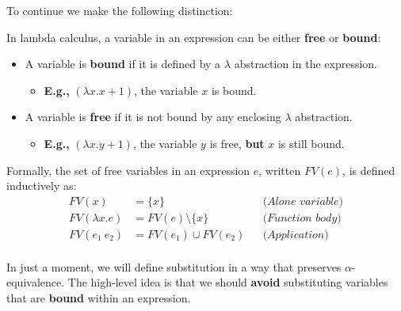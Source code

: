 \noindent
To continue we make the following distinction:
\begin{Def}

    In lambda calculus, a variable in an expression can be either \textbf{free} or \textbf{bound}:
    
    \begin{itemize}
      \item A variable is \textbf{bound} if it is defined by a $\lambda$ abstraction in the expression. 
      \begin{itemize}
        \item \textbf{E.g.,} $(\lambda x. x + 1)$, the variable $x$ is bound.
      \end{itemize}
      \item A variable is \textbf{free} if it is not bound by any enclosing $\lambda$ abstraction.
        \begin{itemize}
            \item \textbf{E.g.,} $(\lambda x. y + 1)$, the variable $y$ is free, \textbf{but} $x$ is still bound.
        \end{itemize} 
    \end{itemize}
    
    \noindent
    Formally, the set of free variables in an expression $e$, written $\mathit{FV}(e)$, is defined inductively as:
    \[
    \begin{aligned}
      \mathit{FV}(x) & = \{x\} && \textit{(Alone variable)} \\
      \mathit{FV}(\lambda x. e) & = \mathit{FV}(e) \setminus \{x\} && \textit{(Function body)}\\
      \mathit{FV}(e_1\ e_2) & = \mathit{FV}(e_1) \cup \mathit{FV}(e_2) && \textit{(Application)}\\
    \end{aligned}
    \]
    

    \end{Def}



    \noindent
    In just a moment, we will define substitution in a way that preserves $\alpha$-equivalence. 
    The high-level idea is that we should \textbf{avoid} substituting variables that are \textbf{bound} within an expression.
    
\newpage

